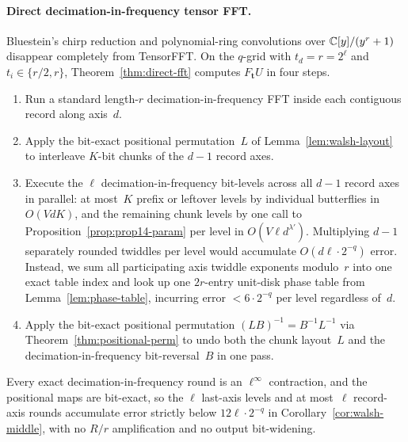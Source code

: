\paragraph{Direct decimation-in-frequency tensor FFT.}
Bluestein's chirp reduction and polynomial-ring convolutions over $\mathbb{C}[y]/(y^r+1)$ disappear completely from \textsf{TensorFFT}. On the $q$-grid with $t_d=r=2^\ell$ and $t_i\in\{r/2,r\}$, Theorem~\ref{thm:direct-fft} computes $F_{\mathbf t}U$ in four steps.
\begin{enumerate}[label=(\arabic*),nosep,leftmargin=*]
  \item Run a standard length-$r$ decimation-in-frequency FFT inside each contiguous record along axis~$d$.

  \item Apply the bit-exact positional permutation~$L$ of Lemma~\ref{lem:walsh-layout} to interleave $K$-bit chunks of the $d-1$ record axes.

  \item Execute the $\ell$ decimation-in-frequency bit-levels across all $d-1$ record axes in parallel: at most~$K$ prefix or leftover levels by individual butterflies in $O(VdK)$, and the remaining chunk levels by one call to Proposition~\ref{prop:prop14-param} per level in $O(V\ell d^{\lambda'})$. Multiplying $d-1$ separately rounded twiddles per level would accumulate $O(d\ell\cdot 2^{-q})$ error. Instead, we sum all participating axis twiddle exponents modulo~$r$ into one exact table index and look up one $2r$-entry unit-disk phase table from Lemma~\ref{lem:phase-table}, incurring error $<6\cdot 2^{-q}$ per level regardless of~$d$.

  \item Apply the bit-exact positional permutation $(LB)^{-1}=B^{-1}L^{-1}$ via Theorem~\ref{thm:positional-perm} to undo both the chunk layout~$L$ and the decimation-in-frequency bit-reversal~$B$ in one pass.
\end{enumerate}
Every exact decimation-in-frequency round is an $\ell^\infty$ contraction, and the positional maps are bit-exact, so the $\ell$ last-axis levels and at most~$\ell$ record-axis rounds accumulate error strictly below $12\ell\cdot 2^{-q}$ in Corollary~\ref{cor:walsh-middle}, with no $R/r$ amplification and no output bit-widening.

